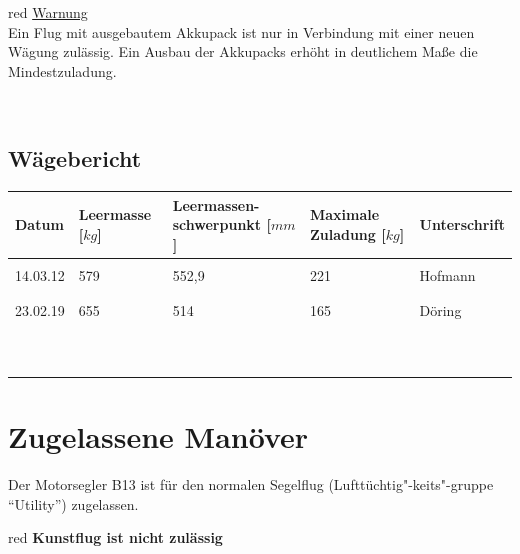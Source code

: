 \begin{color}{red}
\large{\underline{Warnung}}\\
Ein Flug mit ausgebautem Akkupack ist nur in Verbindung mit einer neuen Wägung zulässig. Ein Ausbau der Akkupacks erhöht in deutlichem Maße die Mindestzuladung.
\end{color}\\

\subsection{Wägebericht}

\begin{tiny}
\begin{tabular}{|m{}|m{}|m{2cm}|m{}|m{}|}
\hline
Datum & Leermasse [$\unit{kg}$] & Leermassen- schwerpunkt [$\unit{mm}$]  & Maximale Zuladung [$\unit{kg}$] & Unterschrift\\

\hline
& & & &\\
14.03.12 & 579 & 552,9 & 221 & Hofmann\\
& & & &\\
\hline
& & & &\\
23.02.19 & 655 & 514 & 165 & Döring\\
& & & &\\
\hline
& & & &\\
& & & &\\
& & & &\\
\hline
& & & &\\
& & & &\\
& & & &\\
\hline
& & & &\\
& & & &\\
& & & &\\
\hline

\end{tabular}
\end{tiny}


\section{Zugelassene Manöver}
Der Motorsegler B13 ist für den normalen Segelflug (Lufttüchtig"-keits"-gruppe "`Utility"') zugelassen.\\
\newline
\begin{color}{red}
\textbf{Kunstflug ist nicht zulässig}
\end{color}

